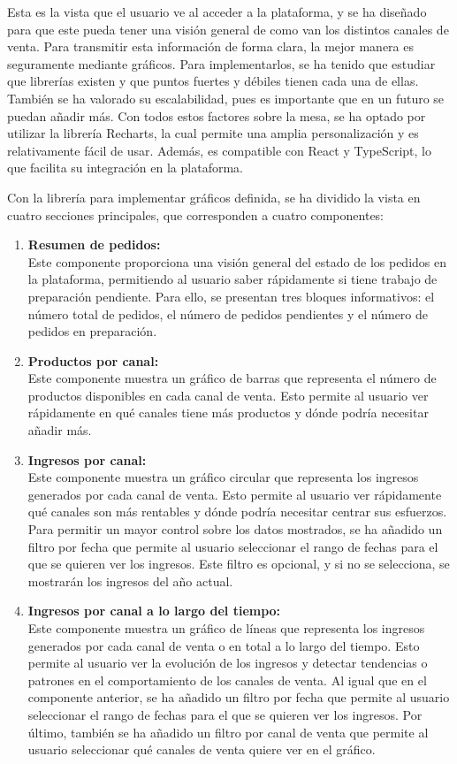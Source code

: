 Esta es la vista que el usuario ve al acceder a la plataforma, y se ha diseñado para que este pueda tener una visión general de como van los distintos canales de venta. Para transmitir esta información de forma clara, la mejor manera es seguramente mediante gráficos. Para implementarlos, se ha tenido que estudiar que librerías existen y que puntos fuertes y débiles tienen cada una de ellas. También se ha valorado su escalabilidad, pues es importante que en un futuro se puedan añadir más. Con todos estos factores sobre la mesa, se ha optado por utilizar la librería Recharts, la cual permite una amplia personalización y es relativamente fácil de usar. Además, es compatible con React y TypeScript, lo que facilita su integración en la plataforma.

Con la librería para implementar gráficos definida, se ha dividido la vista en cuatro secciones principales, que corresponden a cuatro componentes:

\begin{enumerate}
    \item \textbf{Resumen de pedidos:} \\
          Este componente proporciona una visión general del estado de los pedidos en la plataforma, permitiendo al usuario saber rápidamente si tiene trabajo de preparación pendiente. Para ello, se presentan tres bloques informativos: el número total de pedidos, el número de pedidos pendientes y el número de pedidos en preparación.
    \item \textbf{Productos por canal:} \\
          Este componente muestra un gráfico de barras que representa el número de productos disponibles en cada canal de venta. Esto permite al usuario ver rápidamente en qué canales tiene más productos y dónde podría necesitar añadir más.
    \item \textbf{Ingresos por canal:} \\
          Este componente muestra un gráfico circular que representa los ingresos generados por cada canal de venta. Esto permite al usuario ver rápidamente qué canales son más rentables y dónde podría necesitar centrar sus esfuerzos. Para permitir un mayor control sobre los datos mostrados, se ha añadido un filtro por fecha que permite al usuario seleccionar el rango de fechas para el que se quieren ver los ingresos. Este filtro es opcional, y si no se selecciona, se mostrarán los ingresos del año actual.
    \item \textbf{Ingresos por canal a lo largo del tiempo:} \\
          Este componente muestra un gráfico de líneas que representa los ingresos generados por cada canal de venta o en total a lo largo del tiempo. Esto permite al usuario ver la evolución de los ingresos y detectar tendencias o patrones en el comportamiento de los canales de venta. Al igual que en el componente anterior, se ha añadido un filtro por fecha que permite al usuario seleccionar el rango de fechas para el que se quieren ver los ingresos. Por último, también se ha añadido un filtro por canal de venta que permite al usuario seleccionar qué canales de venta quiere ver en el gráfico.
\end{enumerate}

